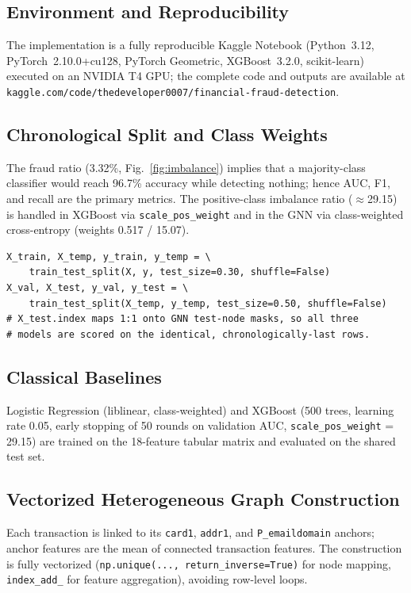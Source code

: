 \documentclass[conference]{IEEEtran}
\begin{document}
\subsection{Environment and Reproducibility}
The implementation is a fully reproducible Kaggle Notebook (Python~3.12,
PyTorch~2.10.0+cu128, PyTorch Geometric, XGBoost~3.2.0, scikit-learn)
executed on an NVIDIA T4 GPU; the complete code and outputs are available
at \texttt{kaggle.com/code/thedeveloper0007/financial-fraud-detection}.

\subsection{Chronological Split and Class Weights}
The fraud ratio (3.32\%, Fig.~\ref{fig:imbalance}) implies that a
majority-class classifier would reach 96.7\% accuracy while detecting
nothing; hence AUC, F1, and recall are the primary metrics. The
positive-class imbalance ratio ($\approx$29.15) is handled in XGBoost via
\texttt{scale\_pos\_weight} and in the GNN via class-weighted
cross-entropy (weights 0.517 / 15.07).

\begin{lstlisting}[style=pystyle,
  caption={Chronological 70/15/15 split (time-ordered, shuffle disabled).},
  label={lst:split}]
X_train, X_temp, y_train, y_temp = \
    train_test_split(X, y, test_size=0.30, shuffle=False)
X_val, X_test, y_val, y_test = \
    train_test_split(X_temp, y_temp, test_size=0.50, shuffle=False)
# X_test.index maps 1:1 onto GNN test-node masks, so all three
# models are scored on the identical, chronologically-last rows.
\end{lstlisting}

\subsection{Classical Baselines}
Logistic Regression (liblinear, class-weighted) and XGBoost (500 trees,
learning rate 0.05, early stopping of 50 rounds on validation AUC,
\texttt{scale\_pos\_weight} = 29.15) are trained on the 18-feature
tabular matrix and evaluated on the shared test set.

\subsection{Vectorized Heterogeneous Graph Construction}
Each transaction is linked to its \texttt{card1}, \texttt{addr1}, and
\texttt{P\_emaildomain} anchors; anchor features are the mean of connected
transaction features. The construction is fully vectorized
(\texttt{np.unique(..., return\_inverse=True)} for node mapping,
\texttt{index\_add\_} for feature aggregation), avoiding row-level loops.
\end{document}
